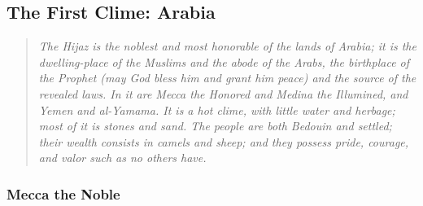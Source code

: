 \documentclass[11pt,a4paper]{article}
\begin{document}
\vspace{0.5cm}



\subsection{The First Clime: Arabia}



{\small\arabicfont

}



\bigskip



\begin{quote}

\small

\textit{The Hijaz is the noblest and most honorable of the lands of Arabia; it is the dwelling-place of the Muslims and the abode of the Arabs, the birthplace of the Prophet (may God bless him and grant him peace) and the source of the revealed laws. In it are Mecca the Honored and Medina the Illumined, and Yemen and al-Yamama. It is a hot clime, with little water and herbage; most of it is stones and sand. The people are both Bedouin and settled; their wealth consists in camels and sheep; and they possess pride, courage, and valor such as no others have.}

\end{quote}



\vspace{0.5cm}



\subsubsection{Mecca the Noble}
\end{document}
